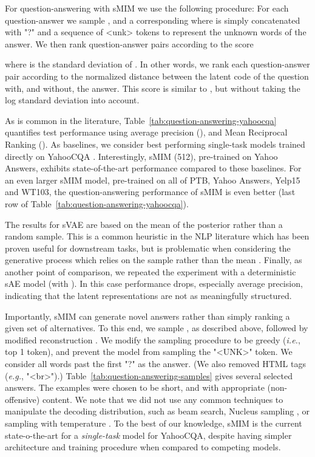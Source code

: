 \documentclass{article}
\newcommand{\eg}{{\em e.g.}}
\newcommand{\ie}{{\em i.e.}}
\begin{document}
For question-answering with sMIM we use the following procedure:
For each question-answer we sample , and a corresponding 
 where  is simply  concatenated 
with "?" and a sequence of <unk> tokens to represent the  unknown words of the answer.
We then rank question-answer pairs according to the score

where  is the standard deviation of . 
In other words, we rank each question-answer pair according to the normalized distance between  
the latent code of the question with, and without, the answer. This score is similar 
to  , but without taking the log standard deviation into account. 

As is common in the literature, Table\ \ref{tab:question-answering-yahoocqa} quantifies test performance 
using average precision 
(), 
and Mean Reciprocal Ranking ().
As baselines, we consider best performing single-task models trained directly on YahooCQA \citep{DBLP:journals/corr/SantosTXZ16,DBLP:journals/corr/TayLH17a}.
Interestingly, sMIM (512), pre-trained on Yahoo Answers, exhibits state-of-the-art 
performance compared to these baselines.
For an even larger sMIM model, pre-trained on all of PTB, Yahoo Answers, Yelp15
and WT103, the question-answering performance of sMIM is even better
(last row of Table\ \ref{tab:question-answering-yahoocqa}).

The results for sVAE are based on the mean of the posterior rather than a random sample.
This is a common heuristic in the NLP literature which has been proven useful for downstream tasks, 
but is problematic when considering the generative process which relies on the sample rather than the mean \citep{bosc-vincent-2020-sequence}. 
Finally, as another point of comparison, we repeated the experiment with a 
deterministic sAE model (with ).
In this case performance drops, especially average precision, indicating that 
the latent representations are not as meaningfully structured.

Importantly, sMIM can generate novel answers rather than simply ranking a given set of alternatives.
To this end, we sample , as described above,
followed by modified reconstruction . 
We modify the sampling procedure to be greedy (\ie, top 1 token), and prevent 
the model from sampling the "\textsc{<UNK>}" token.
We consider all words past the first "?" as the answer. (We also removed HTML tags (\eg, "<br>").)
Table\ \ref{tab:question-answering-samples} gives several selected answers.
The examples were chosen to be short, and with appropriate (non-offensive) content.
We note that we did not use any common techniques to manipulate the decoding distribution,
such as beam search, Nucleus sampling \citep{DBLP:journals/corr/abs-1904-09751}, or sampling with temperature \citep{ACKLEY1985147}.
To the best of our knowledge, sMIM is the current state-o-the-art for a {\em single-task} model for YahooCQA, 
despite having simpler architecture and training procedure when compared to competing models.
\end{document}
